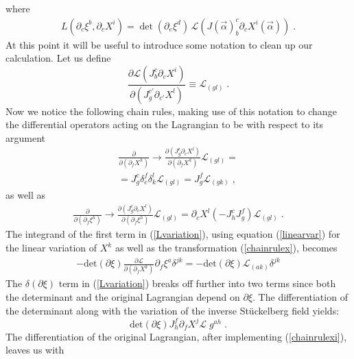 \documentclass[%
 reprint,
 amsmath,amssymb,
 aps,
]{revtex4-1}
\begin{document}
where
\begin{eqnarray}
    L(\partial_c \xi^b, \partial_c X^i) = \mathrm{\det}( \partial_e \xi^d )
    \, \mathcal{L}( J(\vec{\alpha})^c_b \partial_c X^i(\vec{\alpha}) )\;.  \nonumber
\end{eqnarray}
At this point it will be useful to introduce some notation to clean up our calculation.  Let us define
\begin{equation}
    \frac{\partial \mathcal{L}(J^c_b \partial_c X^i)}{\partial (J^{c'}_g \partial_{c'} X^l)} \equiv \mathcal{L}_{(g l)} \; . \nonumber
\end{equation}
Now we notice the following chain rules, making use of this notation to change the differential operators acting
on the Lagrangian to be with respect to its argument
\begin{gather}
    \frac{\partial}{\partial(\partial_f X^k)} \rightarrow
    \frac{\partial(J^c_g \partial_c X^l)}{\partial (\partial_f X^k)}
    \mathcal{L}_{(g l)} = \nonumber \\
    = J^c_g \delta^f_c \delta^l_k \mathcal{L}_{(g l)}= J^f_g \mathcal{L}_{(g k)} \; ,
    \label{chainrulex}
\end{gather}
as well as
\begin{gather}
\label{chainrulexi}
    \frac{\partial}{\partial (\partial_f \xi^h)} \rightarrow
    \frac{\partial (J^c_g \partial_c X^l)}{\partial (\partial_f \xi^h)} \mathcal{L}_{(g l)}
    = \partial_c X^l (-J^c_h J^f_g)  \mathcal{L}_{(g l)} \; .
\end{gather}
The integrand of the first term in (\ref{Lvariation}), using equation (\ref{linearvar}) for
the linear variation of $X^k$ as well as the transformation (\ref{chainrulex}), becomes
\begin{eqnarray}
    -\mathrm{det}(\partial \xi)
    \frac{\partial \mathcal{L} }{\partial \left(  \partial_f X^k \right)} \partial_f \xi^a \delta^{j k}
    =
    -\mathrm{det} ( \partial \xi ) \mathcal{L}_{(a k)} \delta^{j k}
\label{term1}
\end{eqnarray}
The $\delta (\partial\xi)$ term in (\ref{Lvariation}) breaks off further into two terms since both the determinant and the original
Lagrangian depend on $\partial \xi$. The differentiation of the determinant along with the variation of the inverse
St\"uckelberg field yields:
\begin{equation}
\label{term2}
    \mathrm{det} ( \partial \xi ) J^f_h \partial_f X^j \mathcal{L} \; g^{a h} \; .
\end{equation}
The differentiation of the original Lagrangian, after implementing (\ref{chainrulexi}), leaves us with
\end{document}
